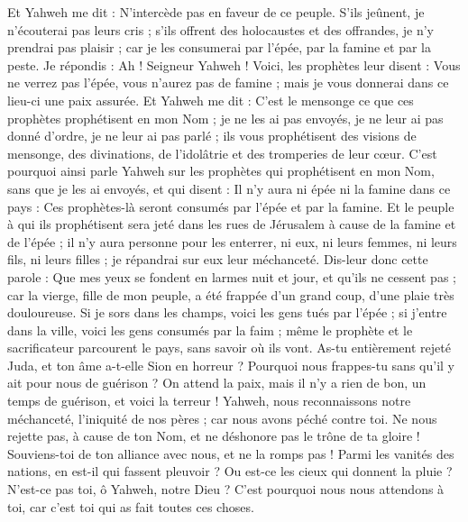 \begin{multicols}{2}
Et Yahweh me dit : N’intercède pas en faveur de ce peuple.
S’ils jeûnent, je n'écouterai pas leurs cris ; s’ils offrent des holocaustes et des offrandes, je n'y prendrai pas plaisir ; car je les consumerai par l'épée, par la famine et par la peste.
Je répondis : Ah ! Seigneur Yahweh ! Voici, les prophètes leur disent : Vous ne verrez pas l'épée, vous n'aurez pas de famine ; mais je vous donnerai dans ce lieu-ci une paix assurée.
Et Yahweh me dit : C’est le mensonge ce que ces prophètes prophétisent en mon Nom ; je ne les ai pas envoyés, je ne leur ai pas donné d’ordre, je ne leur ai pas parlé ; ils vous prophétisent des visions de mensonge, des divinations, de l’idolâtrie et des tromperies de leur cœur.
C'est pourquoi ainsi parle Yahweh sur les prophètes qui prophétisent en mon Nom, sans que je les ai envoyés, et qui disent : Il n’y aura ni épée ni la famine dans ce pays : Ces prophètes-là seront consumés par l'épée et par la famine.
Et le peuple à qui ils prophétisent sera jeté dans les rues de Jérusalem à cause de la famine et de l'épée ; il n'y aura personne pour les enterrer, ni eux, ni leurs femmes, ni leurs fils, ni leurs filles ; je répandrai sur eux leur méchanceté.
Dis-leur donc cette parole : Que mes yeux se fondent en larmes nuit et jour, et qu'ils ne cessent pas ; car la vierge, fille de mon peuple, a été frappée d’un grand coup, d’une plaie très douloureuse.
Si je sors dans les champs, voici les gens tués par l'épée ; si j'entre dans la ville, voici les gens consumés par la faim ; même le prophète et le sacrificateur parcourent le pays, sans savoir où ils vont.
As-tu entièrement rejeté Juda, et ton âme a-t-elle Sion en horreur ? Pourquoi nous frappes-tu sans qu'il y ait pour nous de guérison ? On attend la paix, mais il n'y a rien de bon, un temps de guérison, et voici la terreur !
Yahweh, nous reconnaissons notre méchanceté, l'iniquité de nos pères ; car nous avons péché contre toi.
Ne nous rejette pas, à cause de ton Nom, et ne déshonore pas le trône de ta gloire ! Souviens-toi de ton alliance avec nous, et ne la romps pas !
Parmi les vanités des nations, en est-il qui fassent pleuvoir ? Ou est-ce les cieux qui donnent la pluie ? N'est-ce pas toi, ô Yahweh, notre Dieu ? C'est pourquoi nous nous attendons à toi, car c'est toi qui as fait toutes ces choses.

\end{multicols}
